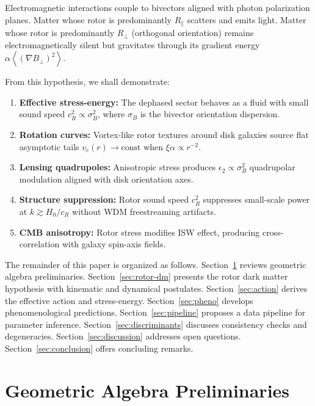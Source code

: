 \documentclass[11pt,a4paper]{article}
\numberwithin{equation}{section}
\theoremstyle{plain}
\theoremstyle{definition}
\theoremstyle{remark}
\newcommand{\avg}[1]{\left\langle #1 \right\rangle}
\begin{document}
Electromagnetic interactions couple to bivectors aligned with photon polarization planes. Matter whose rotor is predominantly $R_\parallel$ scatters and emits light. Matter whose rotor is predominantly $R_\perp$ (orthogonal orientation) remains electromagnetically silent but gravitates through its gradient energy $\alpha \avg{(\nabla B_\perp)^2}$.

From this hypothesis, we shall demonstrate:

\begin{enumerate}[leftmargin=*,itemsep=3pt]
  \item \textbf{Effective stress-energy:} The dephased sector behaves as a fluid with small sound speed $c_R^2\propto\sigma_B^2$, where $\sigma_B$ is the bivector orientation dispersion.
  \item \textbf{Rotation curves:} Vortex-like rotor textures around disk galaxies source flat asymptotic tails $v_c(r)\to\text{const}$ when $\xi\alpha\propto r^{-2}$.
  \item \textbf{Lensing quadrupoles:} Anisotropic stress produces $\epsilon_2\propto\sigma_B^2$ quadrupolar modulation aligned with disk orientation axes.
  \item \textbf{Structure suppression:} Rotor sound speed $c_R^2$ suppresses small-scale power at $k\gtrsim H_0/c_R$ without WDM freestreaming artifacts.
  \item \textbf{CMB anisotropy:} Rotor stress modifies ISW effect, producing cross-correlation with galaxy spin-axis fields.
\end{enumerate}

The remainder of this paper is organized as follows. Section~\ref{sec:prelim} reviews geometric algebra preliminaries. Section~\ref{sec:rotor-dm} presents the rotor dark matter hypothesis with kinematic and dynamical postulates. Section~\ref{sec:action} derives the effective action and stress-energy. Section~\ref{sec:pheno} develops phenomenological predictions. Section~\ref{sec:pipeline} proposes a data pipeline for parameter inference. Section~\ref{sec:discriminants} discusses consistency checks and degeneracies. Section~\ref{sec:discussion} addresses open questions. Section~\ref{sec:conclusion} offers concluding remarks.

\vspace{1em}

\section{Geometric Algebra Preliminaries}\label{sec:prelim}
\end{document}
